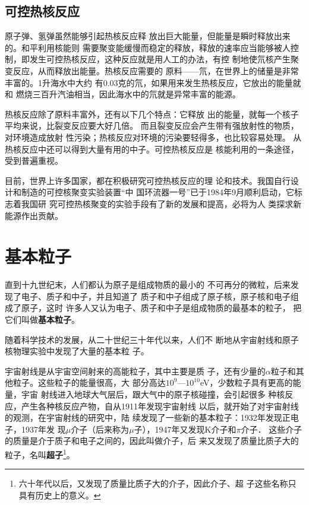 \subsection{可控热核反应}

原子弹、氢弹虽然能够引起热核反应释
放出巨大能量，但能量是瞬时释放出来的。和平利用核能则
需要聚变能缓慢而稳定的释放，释放的速率应当能够被人控
制，即发生可控热核反应，这种反应就是用人工的办法，有控
制地使氘核产生聚变反应，从而释放出能量。热核反应需要的
原料——氘，在世界上的储量是非常丰富的。1升海水中大约
有0.03克的氘，如果用来发生热核反应，它放出的能量就和
燃烧三百升汽油相当，因此海水中的氘就是异常丰富的能源。

热核反应除了原料丰富外，还有以下几个特点：它释放
出的能量，就每一个核子平均来说，比裂变反应要大好几倍。
而且裂变反应会产生带有强放射性的物质，对环境造成放射
性污染；热核反应对环境的污染要轻得多，也比较容易处理。
从热核反应中还可以得到大量有用的中子。可控热核反应是
核能利用的一条途径，受到普遍重视。

目前，世界上许多国家，都在积极研究可控热核反应的理
论和技术。我国自行设计和制造的可控核聚变实验装置“中
国环流器一号”已于1984年9月顺利启动，它标志着我国研
究可控热核聚变的实验手段有了新的发展和提高，必将为人
类探求新能源作出贡献。

\section{基本粒子}

直到十九世纪末，人们都认为原子是组成物质的最小的
不可再分的微粒，后来发现了电子、质子和中子，并且知道了
质子和中子组成了原子核，原子核和电子组成了原子，这时
许多人又认为电子、质子和中子是组成物质的最基本的粒子，
把它们叫做\textbf{基本粒子}。

随着科学技术的发展，从二十世纪三十年代以来，人们不
断地从宇宙射线和原子核物理实验中发现了大量的基本粒
子。

宇宙射线是从宇宙空间射来的高能粒子，其中主要是质
子，还有少量的$\alpha$粒子和其他粒子。这些粒子的能量很高，大
部分高达$10^9$—$10^{10}$eV，少数粒子具有更高的能量，宇宙
射线进入地球大气层后，跟大气中的原子核碰撞，会引起很多
种核反应，产生各种核反应产物，自从1911年发现宇宙射线
以后，就开始了对宇宙射线的观测，在宇宙射线的研究中，陆
续发现了一些新的基本粒子：1932年发现正电子，1937年发
现$\mu$介子（后来称为$\mu$子），1947年又发现K介子和$\pi$介子．
这些介子的质量是介于质子和电子之间的，因此叫做介子，后
来又发现了质量比质子大的粒子，名叫\textbf{超子}\footnote{六十年代以后，又发现了质量比质子大的介子，因此介子、超
子这些名称只具有历史上的意义。}。

